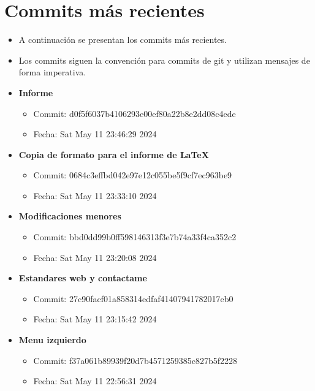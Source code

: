 \section{Commits más recientes}
\begin{itemize}
    \item A continuación se presentan los commits más recientes.
    \item Los commits siguen la convención para commits de git y utilizan mensajes de forma imperativa.
\end{itemize}


\begin{itemize}
    \item \textbf{Informe}
    \begin{itemize}
        \item Commit: d0f5f6037b4106293e00ef80a22b8e2dd08c4ede
        \item Fecha: Sat May 11 23:46:29 2024
    \end{itemize}
    
    \item \textbf{Copia de formato para el informe de LaTeX}
    \begin{itemize}
        \item Commit: 0684c3effbd042e97e12c055be5f9cf7ec963be9
        \item Fecha: Sat May 11 23:33:10 2024
    \end{itemize}
    
    \item \textbf{Modificaciones menores}
    \begin{itemize}
        \item Commit: bbd0dd99b0ff598146313f3e7b74a33f4ca352c2
        \item Fecha: Sat May 11 23:20:08 2024
    \end{itemize}
    
    \item \textbf{Estandares web y contactame}
    \begin{itemize}
        \item Commit: 27c90facf01a858314edfaf41407941782017eb0
        \item Fecha: Sat May 11 23:15:42 2024
    \end{itemize}
    
    \item \textbf{Menu izquierdo}
    \begin{itemize}
        \item Commit: f37a061b89939f20d7b4571259385c827b5f2228
        \item Fecha: Sat May 11 22:56:31 2024
    \end{itemize}
    

\end{itemize}
